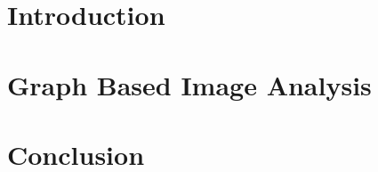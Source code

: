\cleardoublepage %




\part{Introduction}
 



\part{Graph Based Image Analysis} %
% 
 
% 
 

% 

\cleardoublepage %




 
 


\part{Conclusion} 
 

